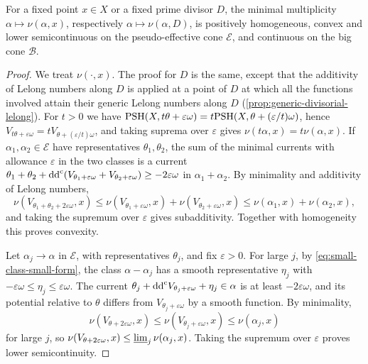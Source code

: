 \begin{proposition}\label{prop:minimal-multiplicity-class-continuity}
For a fixed point $x\in X$ or a fixed prime divisor $D$, the minimal multiplicity $\alpha\mapsto\nu(\alpha,x)$, respectively $\alpha\mapsto\nu(\alpha,D)$, is positively homogeneous, convex and lower semicontinuous on the pseudo-effective cone $\mathcal E$, and continuous on the big cone $\mathcal B$.
\end{proposition}
\begin{proof}
We treat $\nu(\cdot,x)$. The proof for $D$ is the same, except that the additivity of Lelong numbers along $D$ is applied at a point of $D$ at which all the functions involved attain their generic Lelong numbers along $D$ (\cref{prop:generic-divisorial-lelong}). For $t>0$ we have $\mathrm{PSH}(X,t\theta+\varepsilon\omega)=t\mathrm{PSH}(X,\theta+(\varepsilon/t)\omega)$, hence $V_{t\theta+\varepsilon\omega}=tV_{\theta+(\varepsilon/t)\omega}$, and taking suprema over $\varepsilon$ gives $\nu(t\alpha,x)=t\nu(\alpha,x)$. If $\alpha_1,\alpha_2\in\mathcal E$ have representatives $\theta_1,\theta_2$, the sum of the minimal currents with allowance $\varepsilon$ in the two classes is a current $\theta_1+\theta_2+\mathrm{dd}^{\mathrm{c}}(V_{\theta_1+\varepsilon\omega}+V_{\theta_2+\varepsilon\omega})\geq-2\varepsilon\omega$ in $\alpha_1+\alpha_2$. By minimality and additivity of Lelong numbers,
\[
 \nu(V_{\theta_1+\theta_2+2\varepsilon\omega},x)\leq\nu(V_{\theta_1+\varepsilon\omega},x)+\nu(V_{\theta_2+\varepsilon\omega},x)\leq\nu(\alpha_1,x)+\nu(\alpha_2,x),
\]
and taking the supremum over $\varepsilon$ gives subadditivity. Together with homogeneity this proves convexity.

Let $\alpha_j\to\alpha$ in $\mathcal E$, with representatives $\theta_j$, and fix $\varepsilon>0$. For large $j$, by \eqref{eq:small-class-small-form}, the class $\alpha-\alpha_j$ has a smooth representative $\eta_j$ with $-\varepsilon\omega\leq\eta_j\leq\varepsilon\omega$. The current $\theta_j+\mathrm{dd}^{\mathrm{c}} V_{\theta_j+\varepsilon\omega}+\eta_j\in\alpha$ is at least $-2\varepsilon\omega$, and its potential relative to $\theta$ differs from $V_{\theta_j+\varepsilon\omega}$ by a smooth function. By minimality,
\[
 \nu(V_{\theta+2\varepsilon\omega},x)\leq\nu(V_{\theta_j+\varepsilon\omega},x)\leq\nu(\alpha_j,x)
\]
for large $j$, so $\nu(V_{\theta+2\varepsilon\omega},x)\leq\varliminf_j\nu(\alpha_j,x)$. Taking the supremum over $\varepsilon$ proves lower semicontinuity.


\end{proof}
